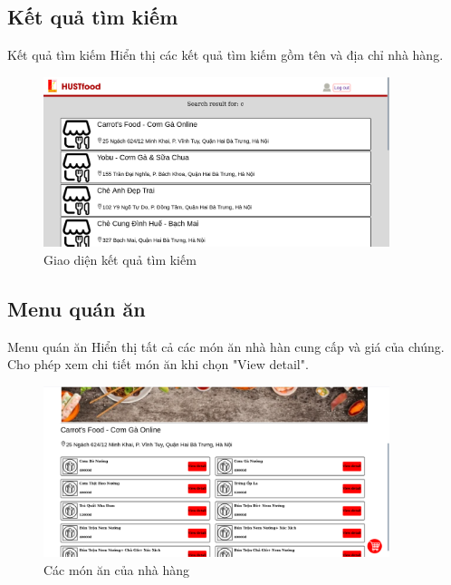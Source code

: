 \documentclass[aspectratio=43,xcolor=dvipsnames]{beamer}
\begin{document}
	\subsection{Kết quả tìm kiếm}
	\begin{frame}{Kết quả tìm kiếm}
	Hiển thị các kết quả tìm kiếm gồm tên và địa chỉ nhà hàng.
		\begin{figure}[ht!]
			\centerline{\includegraphics[width=0.9\textwidth]{web-image/timkiem.png}}
			\caption{Giao diện kết quả tìm kiếm}
			\label{fig:ass1}
		\end{figure}
	\end{frame}
	\subsection{Menu quán ăn}
	\begin{frame}{Menu quán ăn}
	Hiển thị tất cả các món ăn nhà hàn cung cấp và giá của chúng. Cho phép xem chi tiết món ăn khi chọn "View detail". 
		\begin{figure}[ht!]
			\centerline{\includegraphics[width=0.9\textwidth]{web-image/nhahang.png}}
			\caption{Các món ăn của nhà hàng}
			\label{fig:ass1}
		\end{figure}
	\end{frame}
\end{document}
